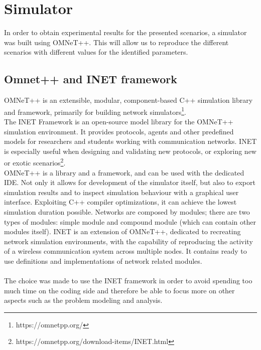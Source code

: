 %
\chapter{Simulator}\label{simulator}
In order to obtain experimental results for the presented scenarios, a simulator
was built using OMNeT++. This will allow us to reproduce the different scenarios
with different values for the identified parameters.\\
\section{Omnet++ and INET framework}
OMNeT++ is an extensible, modular, component-based C++ simulation library and
framework, primarily for building network simulators\footnote{https://omnetpp.org/}.\\
The INET Framework is an open-source model library for the OMNeT++ simulation
environment. It provides protocols, agents and other predefined models for
researchers and students working with communication networks. INET is especially
useful when designing and validating new protocols, or exploring new or exotic
scenarios\footnote{https://omnetpp.org/download-items/INET.html}.\\
OMNeT++ is a library and a framework, and can be used with the dedicated IDE.
Not only it allows for development of the simulator itself, but also to export
simulation results and to inspect simulation behaviour with a graphical user
interface. Exploiting C++ compiler optimizations, it can achieve the lowest
simulation duration possible. Networks are composed by modules; there are two
types of modules: simple module and compound module (which can contain other
modules itself). INET is an extension of OMNeT++, dedicated to recreating 
network simulation environments, with the capability of reproducing the activity
of a wireless communication system across multiple nodes. It contains ready to
use definitions and implementations of network related modules.\\
\\
The choice was made to use the INET framework in order to avoid spending too
much time on the coding side and therefore be able to focus more on other
aspects such as the problem modeling and analysis.
